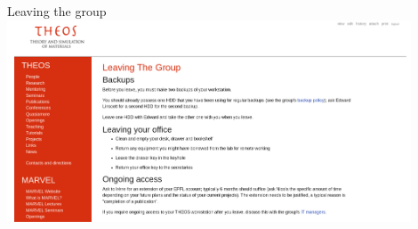 \documentclass[xcolor=table,aspectratio=169]{beamer}
\author{Edward Linscott}
\institute{EPFL}
\date{6 June 2023}
\numberwithin{equation}{section}
\begin{document}
\begin{frame}{Leaving the group}
   \centering
   \includegraphics[width=0.9\textwidth]{figures/leaving_the_group.png}
\end{frame}

\frame{\titlepage}
\end{document}
